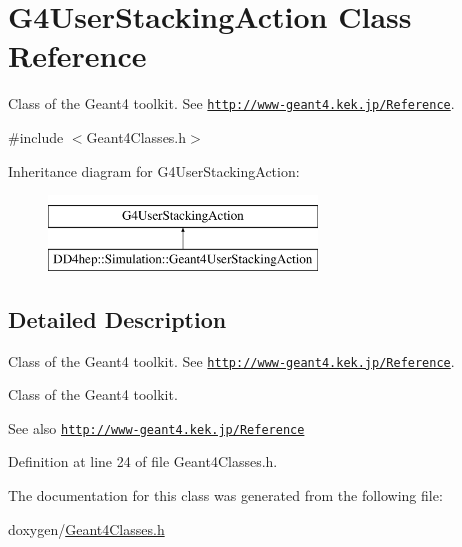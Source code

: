 \hypertarget{class_g4_user_stacking_action}{}\section{G4\+User\+Stacking\+Action Class Reference}
\label{class_g4_user_stacking_action}


Class of the Geant4 toolkit. See \href{http://www-geant4.kek.jp/Reference}{\tt http\+://www-\/geant4.\+kek.\+jp/\+Reference}.  




{\ttfamily \#include $<$Geant4\+Classes.\+h$>$}

Inheritance diagram for G4\+User\+Stacking\+Action\+:\begin{figure}[H]
\begin{center}
\leavevmode
\includegraphics[height=2.000000cm]{class_g4_user_stacking_action}
\end{center}
\end{figure}


\subsection{Detailed Description}
Class of the Geant4 toolkit. See \href{http://www-geant4.kek.jp/Reference}{\tt http\+://www-\/geant4.\+kek.\+jp/\+Reference}. 

Class of the Geant4 toolkit. \begin{DoxySeeAlso}{See also}
\href{http://www-geant4.kek.jp/Reference}{\tt http\+://www-\/geant4.\+kek.\+jp/\+Reference} 
\end{DoxySeeAlso}


Definition at line 24 of file Geant4\+Classes.\+h.



The documentation for this class was generated from the following file\+:\begin{DoxyCompactItemize}
\item 
doxygen/\hyperlink{_geant4_classes_8h}{Geant4\+Classes.\+h}\end{DoxyCompactItemize}
